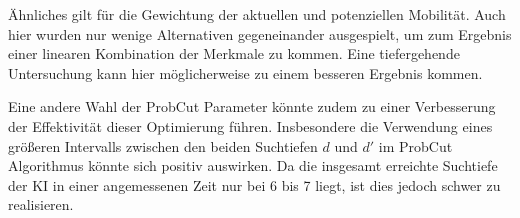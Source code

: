 Ähnliches gilt für die Gewichtung der aktuellen und potenziellen Mobilität. Auch hier wurden nur wenige Alternativen
gegeneinander ausgespielt, um zum Ergebnis einer linearen Kombination der Merkmale zu kommen. Eine tiefergehende
Untersuchung kann hier möglicherweise zu einem besseren Ergebnis kommen.

Eine andere Wahl der ProbCut Parameter könnte zudem zu einer Verbesserung der Effektivität dieser Optimierung führen.
Insbesondere die Verwendung eines größeren Intervalls zwischen den beiden Suchtiefen \(d\) und \(d'\) im ProbCut
Algorithmus könnte sich positiv auswirken. Da die insgesamt erreichte Suchtiefe der KI in einer angemessenen Zeit
nur bei 6 bis 7 liegt, ist dies jedoch schwer zu realisieren.

